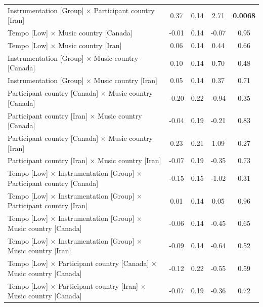 \documentclass[
  bookmarksnumbered]{article}
\begin{document}
\begin{table}[H]
{\begin{tabular}[t]{lcccc}
\hspace{1em}Instrumentation [Group] × Participant country [Iran] & 0.37 & 0.14 & 2.71 & \textbf{0.0068}\\
\hspace{1em}Tempo [Low] × Music country [Canada] & -0.01 & 0.14 & -0.07 & 0.95\\
\hspace{1em}Tempo [Low] × Music country [Iran] & 0.06 & 0.14 & 0.44 & 0.66\\
\hspace{1em}Instrumentation [Group] × Music country [Canada] & 0.10 & 0.14 & 0.70 & 0.48\\
\hspace{1em}Instrumentation [Group] × Music country [Iran] & 0.05 & 0.14 & 0.37 & 0.71\\
\hspace{1em}Participant country [Canada] × Music country [Canada] & -0.20 & 0.22 & -0.94 & 0.35\\
\hspace{1em}Participant country [Iran] × Music country [Canada] & -0.04 & 0.19 & -0.21 & 0.83\\
\hspace{1em}Participant country [Canada] × Music country [Iran] & 0.23 & 0.21 & 1.09 & 0.27\\
\hspace{1em}Participant country [Iran] × Music country [Iran] & -0.07 & 0.19 & -0.35 & 0.73\\
\hspace{1em}Tempo [Low] × Instrumentation [Group] × Participant country [Canada] & -0.15 & 0.15 & -1.02 & 0.31\\
\hspace{1em}Tempo [Low] × Instrumentation [Group] × Participant country [Iran] & 0.01 & 0.14 & 0.05 & 0.96\\
\hspace{1em}Tempo [Low] × Instrumentation [Group] × Music country [Canada] & -0.06 & 0.14 & -0.45 & 0.65\\
\hspace{1em}Tempo [Low] × Instrumentation [Group] × Music country [Iran] & -0.09 & 0.14 & -0.64 & 0.52\\
\hspace{1em}Tempo [Low] × Participant country [Canada] × Music country [Canada] & -0.12 & 0.22 & -0.55 & 0.59\\
\hspace{1em}Tempo [Low] × Participant country [Iran] × Music country [Canada] & -0.07 & 0.19 & -0.36 & 0.72\\

\end{tabular}}
\end{table}
\end{document}
